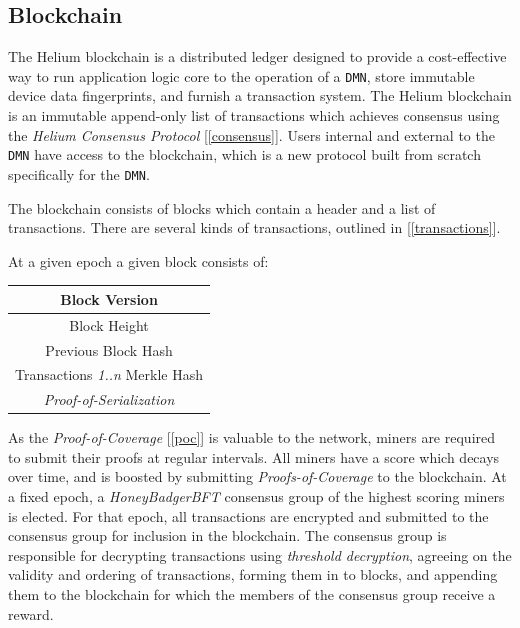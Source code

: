 \documentclass[10pt, nonatbib, nocopyrightspace, reprint]{sigplanconf}
\newcommand{\secref}[1]{[\autoref{#1}]}
\begin{document}
\subsection{Blockchain} \label{blockchain}

The Helium blockchain is a distributed ledger designed to provide a cost-effective way to run application logic core to the operation of a \verb|DMN|, store immutable device data fingerprints, and furnish a transaction system. The Helium blockchain is an immutable append-only list of transactions which achieves consensus using the \emph{Helium Consensus Protocol} \secref{consensus}. Users internal and external to the \verb|DMN| have access to the blockchain, which is a new protocol built from scratch specifically for the \verb|DMN|.

The blockchain consists of blocks which contain a header and a list of transactions. There are several kinds of transactions, outlined in \secref{transactions}. 

At a given epoch a given block consists of:

\begin{center}
    \begin{tabular}{|c|}
         \hline
         Block Version \\
         \hline
         Block Height \\
         \hline
         Previous Block Hash \\
         \hline
         Transactions \emph{1..n} Merkle Hash \\
         \hline
         \emph{Proof-of-Serialization} \\
         \hline
    \end{tabular}
\end{center}

As the \emph{Proof-of-Coverage} \secref{poc} is valuable to the network, miners are required to submit their proofs at regular intervals. All miners have a score which decays over time, and is boosted by submitting \emph{Proofs-of-Coverage} to the blockchain. At a fixed epoch, a \emph{HoneyBadgerBFT} \cite{honeybadger} consensus group of the highest scoring miners is elected. For that epoch, all transactions are encrypted and submitted to the consensus group for inclusion in the blockchain. The consensus group is responsible for decrypting transactions using \emph{threshold decryption}, agreeing on the validity and ordering of transactions, forming them in to blocks, and appending them to the blockchain for which the members of the consensus group receive a reward.
\end{document}
